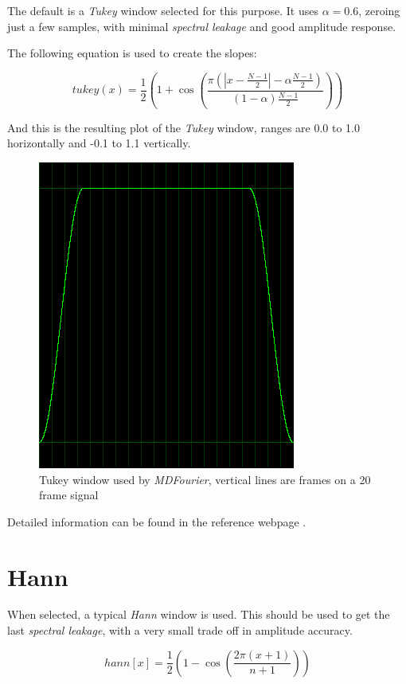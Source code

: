 \documentclass[10pt,a4paper]{report}
\begin{document}
\begin{appendices}
The default is a \textit{Tukey} window selected for this purpose. It uses $\alpha = 0.6$, zeroing just a few samples, with minimal \textit{spectral leakage} and good amplitude response.

The following equation is used to create the slopes:

\begin{equation}
tukey(x)=\frac{1}{2}(1+\cos(\frac{\pi(|x-\frac{N-1}{2}|-\alpha \frac{N-1}{2})}{(1-\alpha)\frac{N-1}{2}}))
\end{equation}

And this is the resulting plot of the \textit{Tukey} window, ranges are 0.0 to 1.0 horizontally and -0.1 to 1.1 vertically.

\begin{figure}[H]
	\centering
	\includegraphics[width=0.4\linewidth]{images/windows/window-tukey.png}
	\caption[Tukey Window]{Tukey window used by \textit{MDFourier}, vertical lines are frames on a 20 frame signal}
	\label{fig:window-tukey}
\end{figure}

Detailed information can be found in the reference webpage \cite{tukey}.

\newpage
\section{Hann}
When selected, a typical \textit{Hann} window is used. This should be used to get the last \textit{spectral leakage}, with a very small trade off in amplitude accuracy.

\begin{equation}
hann[x] = \frac{1}{2}(1 - \cos(\frac{2\pi(x+1)}{n+1}))
\end{equation}


\end{appendices}
\end{document}
